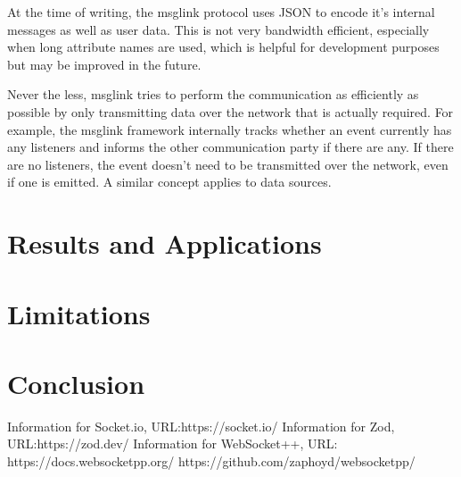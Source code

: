 \documentclass[conference]{IEEEtran}
\begin{document}
At the time of writing, the msglink protocol uses JSON to encode it's internal messages as well as user data. This is not very bandwidth efficient, especially when long attribute names are used, which is helpful for development purposes but may be improved in the future. 

Never the less, msglink tries to perform the communication as efficiently as possible by only transmitting data over the network that is actually required. For example, the msglink framework internally tracks whether an event currently has any listeners and informs the other communication party if there are any. If there are no listeners, the event doesn't need to be transmitted over the network, even if one is emitted. A similar concept applies to data sources.


\section{Results and Applications}

\section{Limitations}

\section{Conclusion}




\listoffigures

\begin{thebibliography}{00}

     Information for Socket.io, URL:https://socket.io/
     Information for Zod, URL:https://zod.dev/
     Information for WebSocket++, URL: https://docs.websocketpp.org/ 
    https://github.com/zaphoyd/websocketpp/

\end{thebibliography}
\end{document}
